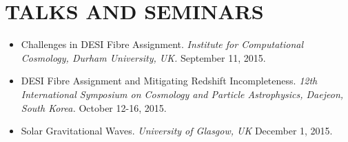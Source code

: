 \section{TALKS AND SEMINARS}
\begin{itemize}

\item Challenges in DESI Fibre Assignment. {\sl Institute for Computational Cosmology, Durham University, UK.} \hfill September 11, 2015.
\item DESI Fibre Assignment and Mitigating Redshift Incompleteness. {\sl 12th International Symposium on Cosmology and Particle Astrophysics, Daejeon, South Korea.} \hfill \hfill October 12-16, 2015.
\item Solar Gravitational Waves. {\sl University of Glasgow, UK} \hfill December 1, 2015.
\end{itemize}